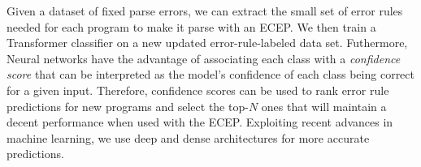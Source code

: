 Given a dataset of fixed parse errors, we can extract the small set of error
rules needed for each program to make it parse with an ECEP. We then train a
Transformer classifier on a new updated error-rule-labeled data set. Futhermore,
Neural networks have the advantage of associating each class with a
\emph{confidence score} that can be interpreted as the model's confidence of
each class being correct for a given input. Therefore, confidence scores can be
used to rank error rule predictions for new programs and select the top-$N$ ones
that will maintain a decent performance when used with the ECEP. Exploiting
recent advances in machine learning, we use deep and dense architectures
\citep{Schmidhuber_2015} for more accurate predictions.
